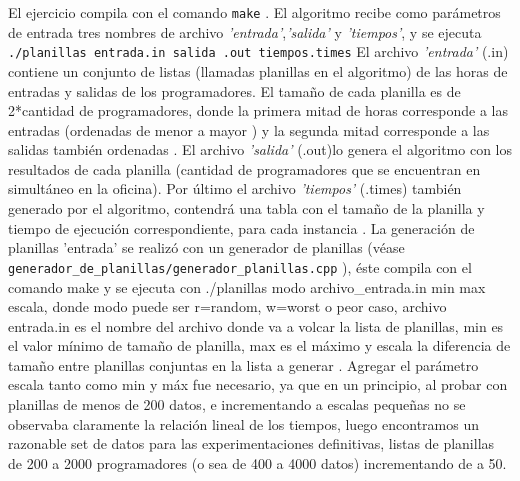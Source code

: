 El ejercicio compila con el comando \texttt{make} .
\newline
El algoritmo recibe como parámetros de entrada tres nombres de archivo \emph{'entrada'},\emph{'salida'} y \emph{'tiempos'}, y se ejecuta \texttt{./planillas entrada.in salida .out tiempos.times}
\newline
El archivo \emph{'entrada'} (.in) contiene un conjunto de listas (llamadas planillas en el algoritmo) de las horas de  entradas y salidas de los programadores.
\newline
El tamaño de cada planilla es de  2*cantidad de programadores, donde la primera mitad de horas corresponde a las entradas (ordenadas de menor a mayor ) y la segunda mitad corresponde a las salidas también ordenadas .
\newline
El archivo \emph{'salida'} (.out)lo genera el algoritmo con los resultados de cada planilla  (cantidad de programadores que se encuentran en simultáneo en la oficina).
\newline
Por último el archivo \emph{'tiempos'} (.times)  también generado por el algoritmo, contendrá una tabla con el tamaño de la planilla y tiempo de ejecución correspondiente, para cada instancia .
\newline
La generación de planillas 'entrada' se realizó con un generador de planillas (véase \texttt{generador\_de\_planillas/generador\_planillas.cpp} ), éste compila con el comando make y se ejecuta con 
./planillas modo archivo\_entrada.in  min max escala, donde modo puede ser r=random, w=worst o peor caso, archivo entrada.in es el nombre del archivo donde va a volcar la lista de planillas, min es el valor mínimo de tamaño de planilla, max es el máximo y escala la diferencia de tamaño entre planillas conjuntas en la lista a generar .
\newline
Agregar el parámetro escala tanto como min y máx fue necesario, ya que en un principio, al probar con planillas de menos de 200 datos, e incrementando a escalas pequeñas no se observaba claramente la relación lineal de los tiempos, luego encontramos un razonable set de datos para las experimentaciones definitivas, listas de planillas de 200 a 2000 programadores (o sea de 400 a 4000 datos) incrementando de a 50.  
